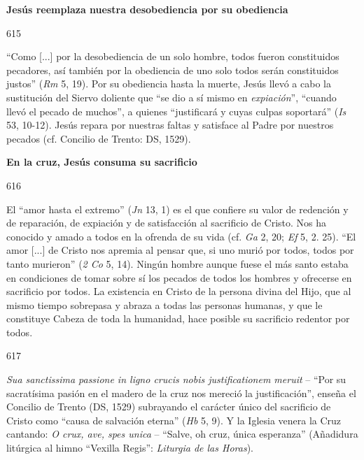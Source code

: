 			\begin{ccebody}\textbf{Jesús reemplaza nuestra desobediencia por su obediencia}\end{ccebody}
			
			\begin{ccebody}\begin{ccenumber}615\end{ccenumber} “Como [...] por la desobediencia de un solo hombre, todos fueron constituidos pecadores, así también por la obediencia de uno solo todos serán constituidos justos” (\textit{Rm} 5, 19). Por su obediencia hasta la muerte, Jesús llevó a cabo la sustitución del Siervo doliente que “se dio a sí mismo en \textit{expiación}”, “cuando llevó el pecado de muchos”, a quienes “justificará y cuyas culpas soportará” (\textit{Is} 53, 10-12). Jesús repara por nuestras faltas y satisface al Padre por nuestros pecados (cf. Concilio de Trento: DS, 1529).\end{ccebody}
			
			\begin{ccebody}\textbf{En la cruz, Jesús consuma su sacrificio}\end{ccebody}
			
			\begin{ccebody}\begin{ccenumber}616\end{ccenumber} El “amor hasta el extremo” (\textit{Jn} 13, 1) es el que confiere su valor de redención y de reparación, de expiación y de satisfacción al sacrificio de Cristo. Nos ha conocido y amado a todos en la ofrenda de su vida (cf. \textit{Ga} 2, 20; \textit{Ef} 5, 2. 25). “El amor [...] de Cristo nos apremia al pensar que, si uno murió por todos, todos por tanto murieron” (\textit{2 Co} 5, 14). Ningún hombre aunque fuese el más santo estaba en condiciones de tomar sobre sí los pecados de todos los hombres y ofrecerse en sacrificio por todos. La existencia en Cristo de la persona divina del Hijo, que al mismo tiempo sobrepasa y abraza a todas las personas humanas, y que le constituye Cabeza de toda la humanidad, hace posible su sacrificio redentor por todos.\end{ccebody}
			
			\begin{ccebody}\begin{ccenumber}617\end{ccenumber} \textit{Sua sanctissima passione in ligno crucis nobis justificationem meruit} – “Por su sacratísima pasión en el madero de la cruz nos mereció la justificación”, enseña el Concilio de Trento (DS, 1529) subrayando el carácter único del sacrificio de Cristo como “causa de salvación eterna” (\textit{Hb} 5, 9). Y la Iglesia venera la Cruz cantando: \textit{O crux, ave, spes unica} – “Salve, oh cruz, única esperanza” (Añadidura litúrgica al himno “Vexilla Regis”: \textit{Liturgia de las Horas}).\end{ccebody}
			
